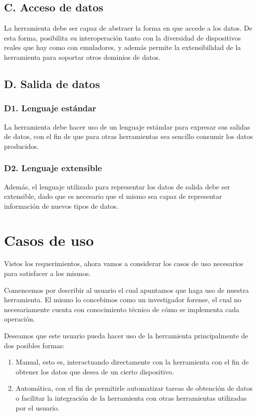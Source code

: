 \subsection*{C. Acceso de datos}
\label{reqC}
La herramienta debe ser capaz de abstraer la forma en que accede a los datos. De esta forma, posibilita su interoperación tanto con la diversidad de dispositivos reales que hay como con emuladores, y además permite la extensibilidad de la herramienta para soportar otros dominios de datos.

\subsection*{D. Salida de datos}
\subsubsection*{D1. Lenguaje estándar}
\label{reqD1}
La herramienta debe hacer uso de un lenguaje estándar para expresar sus salidas de datos, con el fin de que para otras herramientas sea sencillo consumir los datos producidos.

\subsubsection*{D2. Lenguaje extensible}
\label{reqD2}
Además, el lenguaje utilizado para representar los datos de salida debe ser extensible, dado que es necesario que el mismo sea capaz de representar información de nuevos tipos de datos.

\section{Casos de uso}
Vistos los requerimientos, ahora vamos a considerar los casos de uso necesarios para satisfacer a los mismos.

Comencemos por describir al usuario el cual apuntamos que haga uso de nuestra herramienta. El mismo lo concebimos como un investigador forense, el cual no necesariamente cuenta con conocimiento técnico de cómo se implementa cada operación.

Deseamos que este usuario pueda hacer uso de la herramienta principalmente de dos posibles formas:

\begin{enumerate}
\item Manual, esto es, interactuando directamente con la herramienta con el fin de obtener los datos que desea de un cierto dispositivo.
\item Automática, con el fin de permitirle automatizar tareas de obtención de datos o facilitar la integración de la herramienta con otras herramientas utilizadas por el usuario.
\end{enumerate}

